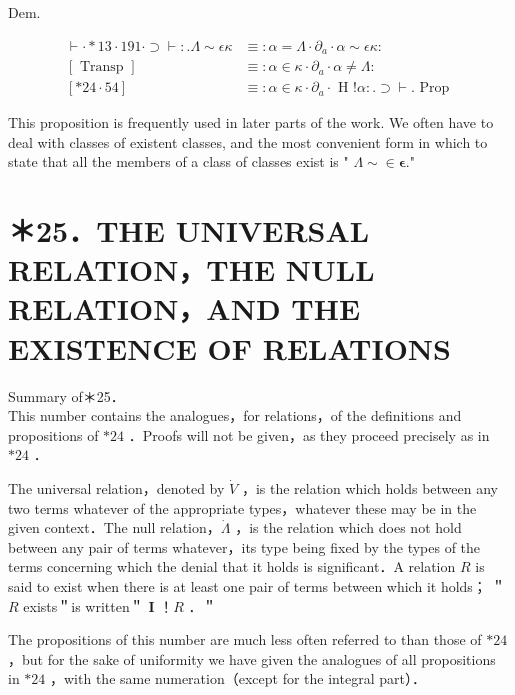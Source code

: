 \documentclass[10pt]{article}
\begin{document}
Dem.

$$
\begin{array}{ll}
\vdash \cdot * 13 \cdot 191 \cdot \supset \vdash: . \Lambda \sim \epsilon \kappa & \equiv: \alpha=\Lambda \cdot \partial_{a} \cdot \alpha \sim \epsilon \kappa: \\
{[\text { Transp }]} & \equiv: \alpha \in \kappa \cdot \partial_{a} \cdot \alpha \neq \Lambda: \\
{[* 24 \cdot 54]} & \equiv: \alpha \in \kappa \cdot \partial_{a} \cdot \text { H }!\alpha: . \supset \vdash . \text { Prop }
\end{array}
$$

This proposition is frequently used in later parts of the work. We often have to deal with classes of existent classes, and the most convenient form in which to state that all the members of a class of classes exist is " $\Lambda \sim \in \boldsymbol{\epsilon}$."

\section*{＊25．THE UNIVERSAL RELATION，THE NULL RELATION，AND THE EXISTENCE OF RELATIONS}
Summary of＊25．\\
This number contains the analogues，for relations，of the definitions and propositions of $* 24$ ．Proofs will not be given，as they proceed precisely as in $* 24$ ．

The universal relation，denoted by $\dot{V}$ ，is the relation which holds between any two terms whatever of the appropriate types，whatever these may be in the given context．The null relation，$\dot{\Lambda}$ ，is the relation which does not hold between any pair of terms whatever，its type being fixed by the types of the terms concerning which the denial that it holds is significant．A relation $R$ is said to exist when there is at least one pair of terms between which it holds； ＂$R$ exists＂is written＂ $\mathbf{I}$ ！$R$ ．＂

The propositions of this number are much less often referred to than those of $* 24$ ，but for the sake of uniformity we have given the analogues of all propositions in $* 24$ ，with the same numeration（except for the integral part）．
\end{document}
